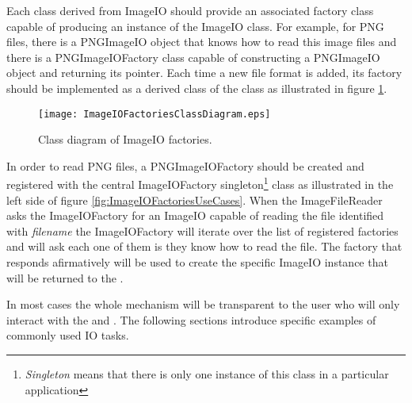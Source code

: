 Each class derived from ImageIO should provide an associated factory class
capable of producing an instance of the ImageIO class. For example, for PNG
files, there is a PNGImageIO object that knows how to read this image files
and there is a PNGImageIOFactory class capable of constructing a PNGImageIO
object and returning its pointer. Each time a new file format is added, its
factory should be implemented as a derived class of the 
class as illustrated in figure \ref{fig:ImageIOFactoriesClassDiagram}. 

\begin{figure}
\center
\texttt{[image: ImageIOFactoriesClassDiagram.eps]}
\caption{Class diagram of ImageIO factories.}
\label{fig:ImageIOFactoriesClassDiagram}
\end{figure}

In order to read PNG files, a PNGImageIOFactory should be created and
registered with the central ImageIOFactory singleton\footnote{\emph{Singleton}
means that there is only one instance of this class in a particular
application} class as illustrated in the left side of figure
\ref{fig:ImageIOFactoriesUseCases}. When the ImageFileReader asks the
ImageIOFactory for an ImageIO capable of reading the file identified with
\emph{filename} the ImageIOFactory will iterate over the list of registered
factories and will ask each one of them is they know how to read the file. The
factory that responds afirmatively will be used to create the specific ImageIO
instance that will be returned to the .

In most cases the whole mechanism will be transparent to the user who will only
interact with the  and . The following
sections introduce specific examples of commonly used IO tasks. 




